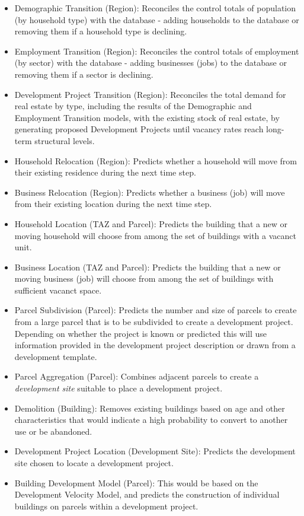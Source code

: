 \begin{itemize}
\begin{itemize}
\item Demographic Transition (Region): Reconciles the control totals of population (by household type) with the database - adding households to the database or removing them if a household type is declining.
\item Employment Transition (Region): Reconciles the control totals of employment (by sector) with the database - adding businesses (jobs) to the database or removing them if a sector is declining.
\item Development Project Transition (Region): Reconciles the total demand for real estate by type, including the results of the Demographic and Employment Transition models, with the existing stock of real estate, by generating proposed Development Projects until vacancy rates reach long-term structural levels.
\item Household Relocation (Region): Predicts whether a household will move from their existing residence during the next time step.
\item Business Relocation (Region): Predicts whether a business  (job) will move from their existing location during the next time step.
\item Household Location (TAZ and Parcel): Predicts the building that a new or moving household will choose from among the set of buildings with a vacanct unit.
\item Business Location (TAZ and Parcel): Predicts the building that a new or moving business (job) will choose from among the set of buildings with sufficient vacanct space.
\item Parcel Subdivision (Parcel): Predicts the number and size of parcels to create from a large parcel that is to be subdivided to create a development project. Depending on whether the project is known or predicted this will use information provided in the development project description or drawn from a development template.
\item Parcel Aggregation (Parcel): Combines adjacent parcels to create a \emph{development site} suitable to place a development project.
\item Demolition (Building): Removes existing buildings based on age and other characteristics that would indicate a high probability to convert to another use or be abandoned.
\item Development Project Location (Development Site): Predicts the development site chosen to locate a development project.
\item Building Development Model (Parcel): This would be based on the Development Velocity Model, and predicts the construction of individual buildings on parcels within a development project.

\end{itemize}
\end{itemize}
